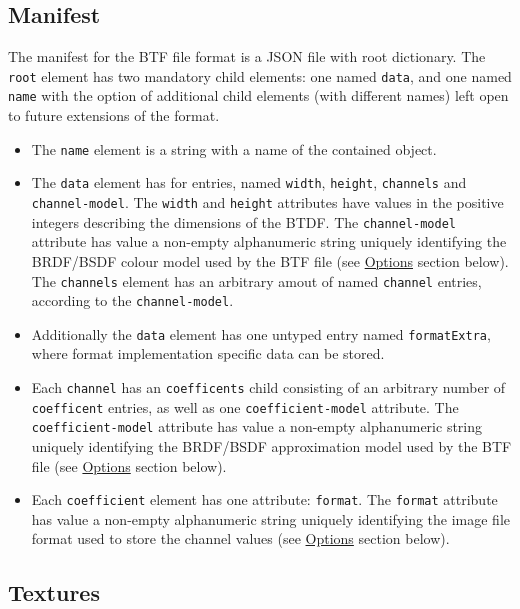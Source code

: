 \hypertarget{manifest}{%
\subsection{Manifest}\label{manifest}}

The manifest for the BTF file format is a JSON file with root
dictionary. The \texttt{root} element has two mandatory child elements:
one named \texttt{data}, and one named \texttt{name} with the option of
additional child elements (with different names) left open to future
extensions of the format.
\begin{itemize}
\item The \texttt{name} element is a string with a
name of the contained object.
\item The \texttt{data} element has for
entries, named \texttt{width}, \texttt{height}, \texttt{channels} and
\texttt{channel-model}. The \texttt{width} and \texttt{height}
attributes have values in the positive integers describing the
dimensions of the BTDF. The \texttt{channel-model} attribute has value a
non-empty alphanumeric string uniquely identifying the BRDF/BSDF colour
model used by the BTF file (see \protect\hyperlink{Options}{Options}
section below). The \texttt{channels} element has an arbitrary amout of
named \texttt{channel} entries, according to the \texttt{channel-model}.
\item Additionally the \texttt{data} element has one untyped entry named
\texttt{formatExtra}, where format implementation specific data can be
stored.
\item Each \texttt{channel} has an \texttt{coefficents} child
consisting of an arbitrary number of \texttt{coefficent} entries, as
well as one \texttt{coefficient-model} attribute. The
\texttt{coefficient-model} attribute has value a non-empty alphanumeric
string uniquely identifying the BRDF/BSDF approximation model used by
the BTF file (see \protect\hyperlink{Options}{Options} section below).
\item Each \texttt{coefficient} element has one attribute: \texttt{format}.
The \texttt{format} attribute has value a non-empty alphanumeric string
uniquely identifying the image file format used to store the channel
values (see \protect\hyperlink{Options}{Options} section below).
\end{itemize}

\hypertarget{textures}{%
\subsection{Textures}\label{textures}}

